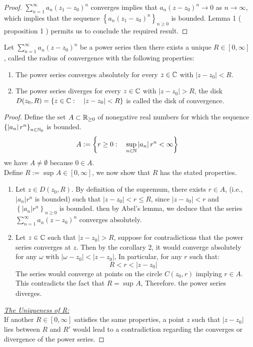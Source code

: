 \begin{proof}
$\sum_{n=1}^{\infty} a_n (z_1-z_0) ^n  $ converges implies  that $a_n (z-z_0) ^n  \rightarrow 0 $  
as $n \rightarrow \infty  $, which implies that the sequence $\left\{ a_n (z_1-z_0) ^n  \right\}_{n \geq 0} $ is bounded.
Lemma 1 ( proposition 1 ) permits us to conclude the required result.
\end{proof}
\begin{theorem}
  Let $\sum_{n=1}^{\infty} a_n (z-z_0) ^n  $ be a power series then there exists a unique $R \in \left[ 0, \infty  \right] $, 
  called the radius of convergence with the following properties: 
  \begin{enumerate}
  \item The power series converges absolutely for every $z \in \mathbb{C}  $ with $\left| z-z_0 \right| <  R $.
    \item The power series diverges for every $z \in \mathbb{C}  $ with $\left| z-z_0 \right|> R $, 
      the disk $D(z_0, R)  = \left\{ z \in  \mathbb{C} : \quad \left| z-z_0 \right|< R \right\} $ is called
      the disk of convergence.
  \end{enumerate}
\end{theorem}

\begin{proof}
Define the set $A \subset \mathbb{R}_{ \geq 0} $ of nonegative real numbers for which 
the sequence $\left\{ \left| a_n  \right| r^{n} \right\}_{n \in \mathbb{N}_0}$  is bounded.
\[
A := 
\left\{ r \geq 0: \quad \sup_{n \in  \mathbb{N}}  \left| a_n  \right|r^{n} < \infty  \right\}
\]
we have $A \neq \emptyset  $ because $ 0 \in  A $. 
\\
Define $R := \sup_{} A \in \left[ 0, \infty  \right]$, we now show that $R $ has the stated
properties.
\begin{enumerate}
\item Let $z \in  D(z_0, R)  $. By definition of the supremum, there exists $r \in  A $, (i.e., 
  $\left| a_n  \right|r^{n} $ is bounded) such that $\left| z-z_0 \right| <  r \leq R$, since 
  $\left| z-z_0 \right|<  r $  and $\left\{ \left| a_n  \right|r^n  \right\}_{n \geq 0}$ is bounded. 
  then by Abel's lemma, we deduce that the series $\sum_{n=1}^{\infty} a_n (z-z_0) ^n  $ converges 
  absolutely.
 \item Let $z \in  \mathbb{C}  $ such that $\left| z-z_0 \right| > R $, suppose for contradictions that the power 
   series converges at $z $. Then by the corollary 2, it would converge absolutely for any
   $\omega  $ with $\left|  \omega - z_0 \right|<   \left| z-z_0 \right|$, In particular, for any $r $ such that: 
   \[
   R < r <  \left| z-z_0\right|
   \]
   The series would converge at points on the circle $C(z_0, r)  $ implying $r \in  A$. This contradicts 
   the fact that $R = \sup_{} A $, Therefore. the power series diverges.
\end{enumerate}
\underline{\emph{The Uniqueness of R:}} \\
If another $R \in \left[ 0, \infty  \right] $ satisfies
the same properties, a point $z $ such that $\left| z-z_0 \right| $ lies between $R $ 
and $R' $ would lead to a contradiction regarding the converges or divergence of the power series.
\end{proof}
